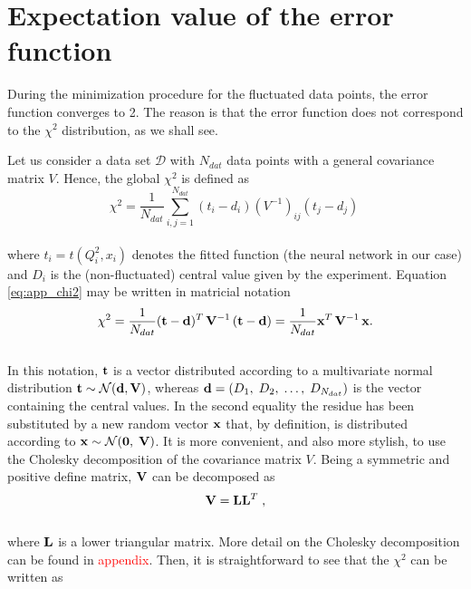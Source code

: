 \documentclass[../main.tex]{subfiles}
\begin{document}
\chapter{Expectation value of the error function}
During the minimization procedure for the fluctuated data points, the error function converges to 2. The reason is that the error function does not correspond to the $\chi^2$ distribution, as we shall see.\par
Let us consider a data set $\mathcal{D}$ with $N_{dat}$ data points with a general covariance matrix $V$. Hence, the global $\chi^2$ is defined as 
\\
\begin{equation}
    \chi^2 = \frac{1}{N_{dat}}\sum_{i,j=1}^{N_{dat}} \left(t_i - d_i \right) \left( V^{-1} \right)_{ij} \left(t_j - d_j \right)\
\label{eq:app_chi2}
\end{equation}
\\
where $t_i = t(Q^2_i, x_i)$ denotes the fitted function (the neural network in our case) and $D_i$ is the (non-fluctuated) central value given by the experiment. Equation \eqref{eq:app_chi2} may be written in matricial notation 
\\
\begin{equation}
    \chi^2 = \frac{1}{N_{dat}} (\mathbf{t} - \mathbf{d})^{T} \, \mathbf{V}^{-1} \, (\mathbf{t} - \mathbf{d}) = \frac{1}{N_{dat}} \mathbf{x}^T \, \mathbf{V}^{-1} \, \mathbf{x}.
    \label{eq:app_chi2mat}
\end{equation}
\\
In this notation, $\mathbf{t}$ is a vector distributed according to a multivariate normal distribution $\mathbf{t} \sim \mathcal{N}(\mathbf{d},\mathbf{V})$, whereas $\mathbf{d} = (D_1,\; D_2,\; \dots,\;  D_{N_{dat}})$ is the vector containing the central values. In the second equality the residue has been substituted by a new random vector $\mathbf{x}$ that, by definition, is distributed according to $\mathbf{x} \sim \mathcal{N}(\mathbf{0},\; \mathbf{V})$. It is more convenient, and also more stylish, to use the Cholesky decomposition of the covariance matrix $V$. Being a symmetric and positive define matrix, $\mathbf{V}$ can be decomposed as
\\
\begin{equation}
    \mathbf{V} = \mathbf{L} \mathbf{L}^T \; ,
\label{eq:app_chodec}
\end{equation}
\\
where $\mathbf{L}$ is a lower triangular matrix. More detail on the Cholesky decomposition can be found in \textcolor{red}{appendix}. Then, it is straightforward to see that the $\chi^2$ can be written as
\end{document}

